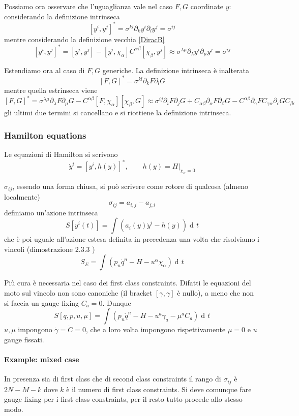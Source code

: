 \documentclass[a4paper, 11pt]{article}
\newcommand{\dd}{\mathop{\mathrm{d}\!}{}}
\begin{document}
	Possiamo ora osservare che l'uguaglianza vale nel caso $F,G$ coordinate $y$: considerando la definizione intrinseca
	\[ [y^i, y^j]^* = \sigma^{kl} \partial_k y^i \partial_l y^j = \sigma^{ij} \]
	mentre considerando la definizione vecchia \ref{DiracB}
	\[ [y^i, y^j]^* = [y^i, y^j] - [y^i, \chi_\alpha] C^{\alpha\beta} [\chi_\beta, y^j] \approx \sigma^{\lambda\mu} \partial_\lambda y^i \partial_\mu y^j = \sigma^{ij} \]
	
	\noindent Estendiamo ora al caso di $F,G$ generiche. La definizione intrinseca è inalterata
	\[ [F, G]^* = \sigma^{kl} \partial_k F \partial_l G \]
	mentre quella estrinseca viene
	\[ [F, G]^* = \sigma^{\lambda\mu} \partial_\lambda F \partial_\mu G - C^{\alpha\beta} [F,\chi_\alpha] [\chi_\beta, G] \approx \sigma^{ij} \partial_i F \partial_j G + C_{\alpha\beta} \partial_\alpha F \partial_\beta G - 
	C^{\alpha\beta} \partial_\gamma F C_{\gamma\alpha} \partial_\epsilon G C_{\beta\epsilon} \]
	gli ultimi due termini si cancellano e si riottiene la definizione intrinseca.
	
	\subsubsection{Hamilton equations}
	Le equazioni di Hamilton si scrivono
	\[ \dot{y}^i = [y^i, h(y)]^*,\qquad h(y) = H|_{\chi_\alpha=0} \]
	
	$\sigma_{ij}$, essendo una forma chiusa, si può scrivere come rotore di qualcosa (almeno localmente)
	\[ \sigma_{ij} = a_{i,j} - a_{j,i} \]
	definiamo un'azione intrinseca
	\[ S\left[y^i(t)\right] = \int \left( a_i(y)\dot{y}^i - h(y) \right) \dd t \]
	che è poi uguale all'azione estesa definita in precedenza una volta che risolviamo i vincoli (dimostrazione 2.3.3 \cite{HT})
	\[ S_E = \int \left(p_n \dot{q}^n - H - u^\alpha \chi_\alpha \right) \dd t \]
	
	Più cura è necessaria nel caso dei first class constraints. Difatti le equazioni del moto sul vincolo non sono canoniche (il bracket $[\gamma,\gamma]$ è nullo), a meno che non si faccia un gauge fixing $C_a = 0$. Dunque
	\[ S\left[q,p,u,\mu\right] = \int \left( p_n\dot{q}^n - H -u^a \gamma_a -\mu^a C_a \right) \dd t \]
	$u,\mu$ impongono $\dot{\gamma}=\dot{C}=0$, che a loro volta impongono rispettivamente $\mu=0$ e $u$ gauge fissati.
	
	\paragraph{Example: mixed case}
	In presenza sia di first class che di second class constraints il rango di $\sigma_{ij}$ è $2N-M-k$ dove $k$ è il numero di first class constraints. Si deve comunque fare gauge fixing per i first class constraints, per il resto tutto procede allo stesso modo.
	
\end{document}
